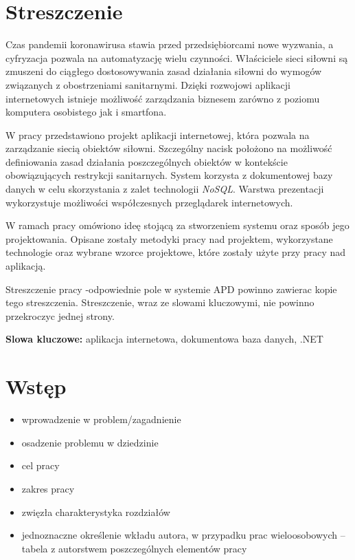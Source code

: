 \documentclass[a4paper,twoside,12pt]{book}
\newcounter{stronyPozaNumeracja}
\begin{document}
\setcounter{stronyPozaNumeracja}{\value{page}}
\mainmatter
\pagestyle{empty}

\chapter*{Streszczenie}

Czas pandemii koronawirusa stawia przed przedsiębiorcami nowe wyzwania, a cyfryzacja pozwala na automatyzację wielu czynności. Właściciele sieci siłowni są zmuszeni do ciągłego dostosowywania zasad działania siłowni do wymogów związanych z obostrzeniami sanitarnymi. Dzięki rozwojowi aplikacji internetowych istnieje możliwość zarządzania biznesem zarówno z poziomu komputera osobistego jak i smartfona.

W pracy przedstawiono projekt aplikacji internetowej, która pozwala na zarządzanie siecią obiektów siłowni. Szczególny nacisk położono na możliwość definiowania zasad działania poszczególnych obiektów w kontekście obowiązujących restrykcji sanitarnych. System korzysta z dokumentowej bazy danych w celu skorzystania z zalet technologii \textit{NoSQL}. Warstwa prezentacji wykorzystuje możliwości współczesnych przeglądarek internetowych.

W ramach pracy omówiono ideę stojącą za stworzeniem systemu oraz sposób jego projektowania. Opisane zostały metodyki pracy nad projektem, wykorzystane technologie oraz wybrane wzorce projektowe, które zostały użyte przy pracy nad aplikacją.

Streszczenie pracy -odpowiednie pole w systemie APD powinno zawierac kopie tego streszczenia. Streszczenie, wraz ze slowami kluczowymi, nie powinno przekroczyc jednej strony.

{\bf Slowa kluczowe:} aplikacja internetowa, dokumentowa baza danych, .NET


\cleardoublepage

\pagestyle{NumeryStronNazwyRozdzialow}


\chapter{Wstęp}

\begin{itemize}
\item wprowadzenie w problem/zagadnienie
\item osadzenie problemu w dziedzinie
\item cel pracy
\item zakres pracy
\item zwięzła charakterystyka rozdziałów
\item jednoznaczne określenie wkładu autora, w przypadku prac wieloosobowych – tabela z autorstwem poszczególnych elementów pracy
\end{itemize}
\end{document}
